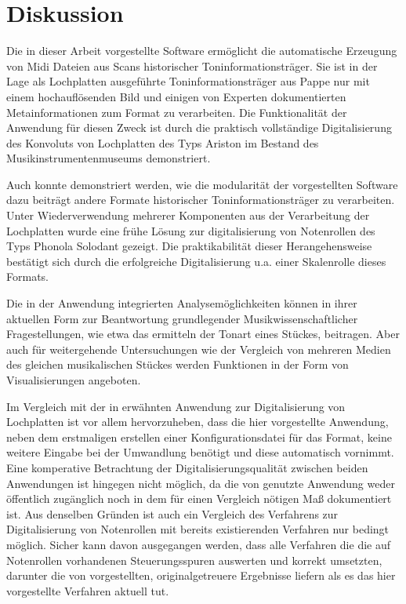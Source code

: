 \section{Diskussion}

Die in dieser Arbeit vorgestellte Software ermöglicht die automatische Erzeugung von Midi Dateien aus Scans historischer Toninformationsträger.
Sie ist in der Lage als Lochplatten ausgeführte Toninformationsträger aus Pappe nur mit einem hochauflösenden Bild und einigen von Experten dokumentierten Metainformationen zum Format zu verarbeiten.
Die Funktionalität der Anwendung für diesen Zweck ist durch die praktisch vollständige Digitalisierung des Konvoluts von Lochplatten des Typs Ariston im Bestand des Musikinstrumentenmuseums demonstriert.

Auch konnte demonstriert werden, wie die modularität der vorgestellten Software dazu beiträgt andere Formate historischer Toninformationsträger zu verarbeiten.
Unter Wiederverwendung mehrerer Komponenten aus der Verarbeitung der Lochplatten wurde eine frühe Lösung zur digitalisierung von Notenrollen des Typs Phonola Solodant gezeigt.
Die praktikabilität dieser Herangehensweise bestätigt sich durch die erfolgreiche Digitalisierung u.a. einer Skalenrolle dieses Formats. 

Die in der Anwendung integrierten Analysemöglichkeiten können in ihrer aktuellen Form zur Beantwortung grundlegender Musikwissenschaftlicher Fragestellungen, wie etwa das ermitteln der Tonart eines Stückes, beitragen.
Aber auch für weitergehende Untersuchungen wie der Vergleich von mehreren Medien des gleichen musikalischen Stückes werden Funktionen in der Form von Visualisierungen angeboten.

Im Vergleich mit der in \textcite[]{perretti_2014} erwähnten Anwendung zur Digitalisierung von Lochplatten ist vor allem hervorzuheben, dass die hier vorgestellte Anwendung, neben dem erstmaligen erstellen einer Konfigurationsdatei für das Format, keine weitere Eingabe bei der Umwandlung benötigt und diese automatisch vornimmt.
Eine komperative Betrachtung der Digitalisierungsqualität zwischen beiden Anwendungen ist hingegen nicht möglich, da die von \textcite[]{perretti_2014} genutzte Anwendung weder öffentlich zugänglich noch in dem für einen Vergleich nötigen Maß dokumentiert ist.
Aus denselben Gründen ist auch ein Vergleich des Verfahrens zur Digitalisierung von Notenrollen mit bereits existierenden Verfahren nur bedingt möglich.
Sicher kann davon ausgegangen werden, dass alle Verfahren die die auf Notenrollen vorhandenen Steuerungsspuren auswerten und korrekt umsetzten, darunter die von \textcite[]{shi_2019, zoltan_1994, colmenares_2011} vorgestellten, originalgetreuere Ergebnisse liefern als es das hier vorgestellte Verfahren aktuell tut.

